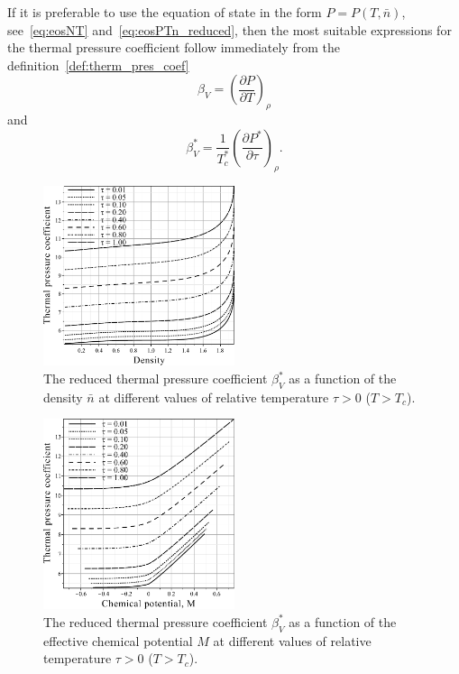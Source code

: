 If it is preferable to use the equation of state in the form $P=P(T, \bar{n})$, see~\eqref{eq:eosNT} and~\eqref{eq:eosPTn_reduced}, then the most suitable expressions for the thermal pressure coefficient follow immediately from the definition~\eqref{def:therm_pres_coef}
\begin{equation}
	\beta_V = \left(\frac{\partial P}{\partial T}\right)_\rho
\end{equation}
and
\begin{equation}
	\label{eq:beta_star_n}
	\beta^*_V = \frac{1}{T^*_c} \left(\frac{\partial P^*}{\partial \tau}\right)_{\rho}.
\end{equation}


\begin{figure}[h!]
	\centering \includegraphics[width=0.5\textwidth]{f3a.pdf}
	\vskip-3mm\caption{The reduced thermal pressure coefficient $\beta^*_V$ as a function of the density $\bar n$ at different values of relative temperature $\tau > 0$ ($T > T_c$). 
	}\label{fig3a}
\end{figure}
\begin{figure}[h!]
	\centering \includegraphics[width=0.5\textwidth]{f3b.pdf}
	\vskip-3mm\caption{The reduced thermal pressure coefficient $\beta^*_V$ as a function of the effective chemical potential $M$ at different values of relative temperature $\tau > 0$ ($T > T_c$). 
	}\label{fig3b}
\end{figure}
